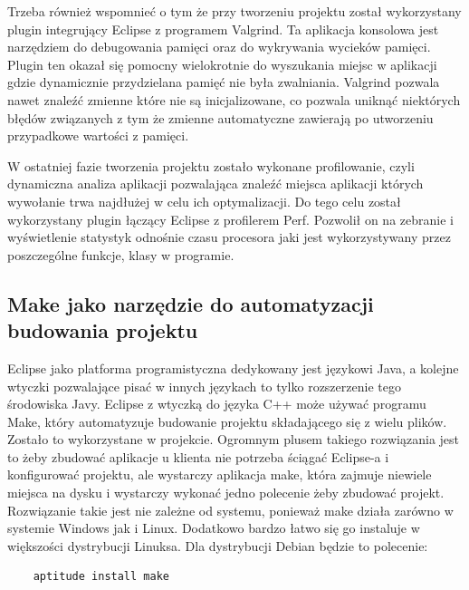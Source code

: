 Trzeba również wspomnieć o tym że przy tworzeniu projektu został wykorzystany plugin integrujący Eclipse z programem Valgrind. 
Ta aplikacja konsolowa jest narzędziem do debugowania pamięci oraz do wykrywania wycieków pamięci. Plugin ten okazał się pomocny wielokrotnie do wyszukania miejsc w aplikacji gdzie dynamicznie przydzielana pamięć nie była zwalniania. Valgrind pozwala nawet znaleźć zmienne które nie są inicjalizowane, co pozwala uniknąć niektórych błędów związanych z tym że zmienne automatyczne zawierają po utworzeniu przypadkowe wartości z pamięci. 

W ostatniej fazie tworzenia projektu zostało wykonane profilowanie, czyli dynamiczna analiza aplikacji pozwalająca znaleźć miejsca aplikacji których wywołanie trwa najdłużej w celu ich optymalizacji. Do tego celu został wykorzystany plugin łączący Eclipse z profilerem Perf. Pozwolił on na zebranie i wyświetlenie statystyk odnośnie czasu procesora jaki jest wykorzystywany przez poszczególne funkcje, klasy w programie.

\subsection{Make jako narzędzie do automatyzacji budowania projektu}

Eclipse jako platforma programistyczna dedykowany jest językowi Java, a kolejne wtyczki pozwalające pisać w innych językach to tylko rozszerzenie tego środowiska Javy. Eclipse z wtyczką do języka C++ może używać programu Make, który automatyzuje budowanie projektu składającego się z wielu plików. Zostało to wykorzystane w projekcie. Ogromnym plusem takiego rozwiązania jest to żeby zbudować aplikacje u klienta nie potrzeba ściągać Eclipse-a i konfigurować projektu, ale wystarczy aplikacja make, która zajmuje niewiele miejsca na dysku i  wystarczy wykonać jedno polecenie żeby zbudować projekt. Rozwiązanie takie jest nie zależne od systemu, ponieważ make działa zarówno w systemie Windows jak i Linux. Dodatkowo bardzo łatwo się go instaluje w większości dystrybucji Linuksa. Dla dystrybucji Debian będzie to polecenie:

\begin{verbatim}
	aptitude install make
\end{verbatim}

